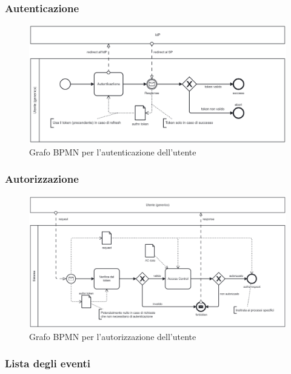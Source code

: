 \documentclass{article}
\begin{document}
\subsubsection{Autenticazione}

\begin{figure}[htbp]
    \label{7.1.1}
    \centering
    \includegraphics[width=1\textwidth]{Images/BPMN - authn.png}
    \caption{Grafo BPMN per l'autenticazione dell'utente}
\end{figure}

\clearpage

\subsubsection{Autorizzazione}

\begin{figure}[htbp]
    \label{7.1.2}
    \centering
    \includegraphics[width=1\textwidth]{Images/BPMN - authz.png}
    \caption{Grafo BPMN per l'autorizzazione dell'utente}
\end{figure}

\clearpage

\subsubsection{Lista degli eventi}
\end{document}
